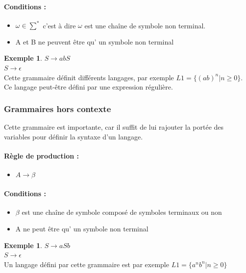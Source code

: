 \documentclass[11pt,a4paper]{article}
\theoremstyle{definition}
\newtheorem{myexem}[mydef]{Exemple}
\begin{document}
\paragraph{Conditions :}

\begin{itemize}
	\item  $\omega \in \sum^*$ c'est à dire $\omega$ est une chaîne de symbole non 
	terminal. 
	\item A et B ne peuvent être qu’ un symbole non terminal
\end{itemize}

\begin{myexem}
	$S \rightarrow abS$ \\
	$S \rightarrow \epsilon$ \\
	Cette grammaire définit différents langages, par exemple $L1 = 
	\{(ab)^n|n \geq 0\}$. Ce langage peut-être défini par une expression 
	régulière.
\end{myexem}


\subsubsection{Grammaires hors contexte}

Cette grammaire est importante, car il suffit de lui rajouter la portée des 
variables pour définir la syntaxe d'un langage.

\paragraph{Règle de production :} 
\begin{itemize}
	\item $A \rightarrow \beta$
\end{itemize}

\paragraph{Conditions :}

\begin{itemize}
	\item  $\beta$ est une chaîne de symbole composé de symboles terminaux
	       	ou non
	\item A ne peut être qu’ un symbole non terminal
\end{itemize}

\begin{myexem}
	$S \rightarrow aSb$ \\
	$S \rightarrow \epsilon$ \\
	Un langage défini par cette grammaire est par exemple $L1 = \{a^nb^n|n 
		\geq 0\}$
\end{myexem}
\end{document}
